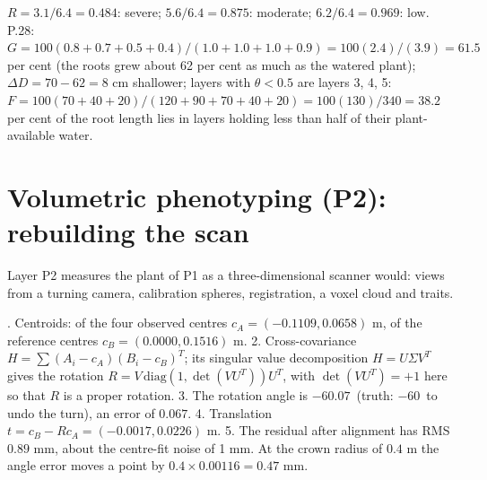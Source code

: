 \sol  $R=3.1/6.4=0.484$: severe; $5.6/6.4=0.875$: moderate; $6.2/6.4=0.969$: low. P.28: $G=100(0.8+0.7+0.5+0.4)/(1.0+1.0+1.0+0.9)=100(2.4)/(3.9)=61.5$ per cent (the roots grew about 62 per cent as much as the watered plant); $\Delta D=70-62=8$ cm shallower; layers with $\theta<0.5$ are layers 3, 4, 5: $F=100(70+40+20)/(120+90+70+40+20)=100(130)/340=38.2$ per cent of the root length lies in layers holding less than half of their plant-available water.


\section{Volumetric phenotyping (P2): rebuilding the scan}
Layer P2 measures the plant of P1 as a three-dimensional scanner would: views from a turning camera, calibration spheres, registration, a voxel cloud and traits.

. Centroids: of the four observed centres $c_A=(-0.1109,0.0658)$ m, of the reference centres $c_B=(0.0000,0.1516)$ m. 2. Cross-covariance $H=\sum(A_i-c_A)(B_i-c_B)^T$; its singular value decomposition $H=U\Sigma V^T$ gives the rotation $R=V\,\mathrm{diag}(1,\det(VU^T))U^T$, with $\det(VU^T)=+1$ here so that $R$ is a proper rotation. 3. The rotation angle is $-60.07$\textdegree\ (truth: $-60$\textdegree\ to undo the turn), an error of $0.067$\textdegree. 4. Translation $t=c_B-Rc_A=(-0.0017,0.0226)$ m. 5. The residual after alignment has RMS $0.89$ mm, about the centre-fit noise of 1 mm. At the crown radius of $0.4$ m the angle error moves a point by $0.4\times0.00116=0.47$ mm.


